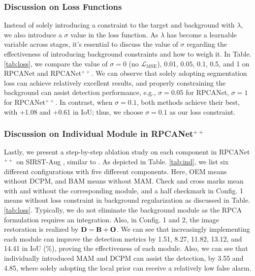 \documentclass[10pt,journal,compsoc]{IEEEtran}
\begin{document}
\subsubsection{Discussion on Loss Functions}
Instead of solely introducing a constraint to the target and background with $\lambda$, we also introduce a $\sigma$ value in the loss function. As $\lambda$ has become a learnable variable across stages, it's essential to discuss the value of $\sigma$ regarding the effectiveness of introducing background constraints and how to weigh it. In Table. \ref{tab:loss}, we compare the value of $\sigma\!=\!0$ (no $\mathcal{L}_{\text{MSE}}$), 0.01, 0.05, 0.1, 0.5, and 1 on RPCANet and RPCANet$^{++}$. We can observe that solely adopting segmentation loss can achieve relatively excellent results, and properly constraining the background can assist detection performance, e.g., $\sigma\!=\!0.05$ for RPCANet, $\sigma\!=\!1$ for RPCANet$^{++}$. In contrast, when $\sigma\!=\!0.1$, both methods achieve their best, with +1.08 and +0.61 in IoU; thus, we choose $\sigma\!=\!0.1$ as our loss constraint.

\subsubsection{Discussion on Individual Module in RPCANet$^{++}$}
Lastly, we present a step-by-step ablation study on each component in RPCANet$^{++}$ on SIRST-Aug \cite{zhang-2023-agpc}, similar to \cite{wu-2024-rpcanet}. As depicted in Table. \ref{tab:ind}, we list six different configurations with five different components. Here, OEM means without DCPM, and BAM means without MAM. Check and cross marks mean with and without the corresponding module, and a half checkmark in Config. 1 means without loss constraint in background regularization as discussed in Table. \ref{tab:loss}. Typically, we do not eliminate the background module as the RPCA formulation requires an integration. Also, in Config. 1 and 2, the image restoration is realized by $\bf{D} = \bf{B} + \bf{O}$. We can see that increasingly implementing each module can improve the detection metrics by 1.51, 8.27, 11.82, 13.12, and 14.41 in IoU (\%), proving the effectiveness of each module. Also, we can see that individually introduced MAM and DCPM can assist the detection, by 3.55 and 4.85, where solely adopting the local prior can receive a relatively low false alarm.
\end{document}
